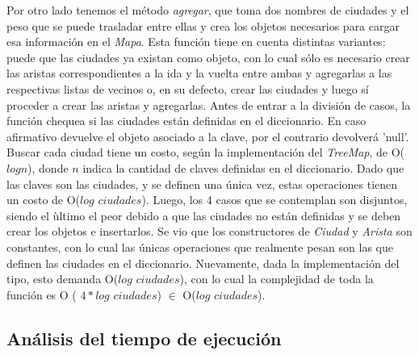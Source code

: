 \indent Por otro lado tenemos el método \textsl{agregar}, que toma dos nombres de ciudades y el peso que se puede trasladar entre ellas y crea los objetos necesarios para cargar esa información en el \textsl{Mapa}. Esta función tiene en cuenta distintas variantes: puede que las ciudades ya existan como objeto, con lo cual sólo es necesario crear las aristas correspondientes a la ida y la vuelta entre ambas y agregarlas a las respectivas listas de vecinos o, en su defecto, crear las ciudades y luego sí proceder a crear las aristas y agregarlas. Antes de entrar a la división de casos, la función chequea si las ciudades están definidas en el diccionario. En caso afirmativo devuelve el objeto asociado a la clave, por el contrario devolverá 'null'. Buscar cada ciudad tiene un costo, según la implementación del \textsl{TreeMap}, de O($log n$), donde $n$ indica la cantidad de claves definidas en el diccionario. Dado que las claves son las ciudades, y se definen una única vez, estas operaciones tienen un costo de O($log$ $ciudades$). Luego, los 4 casos que se contemplan son disjuntos, siendo el ùltimo el peor debido a que las ciudades no están definidas y se deben crear los objetos e insertarlos. Se vio que los constructores de \textsl{Ciudad} y \textsl{Arista} son constantes, con lo cual las únicas operaciones que realmente pesan son las que definen las ciudades en el diccionario. Nuevamente, dada la implementación del tipo, esto demanda O($log$ $ciudades$), con lo cual la complejidad de toda la función es O ( $ 4 * log$ $ciudades$) $\in$ O($log$ $ciudades$).

\subsection{Análisis del tiempo de ejecución}












